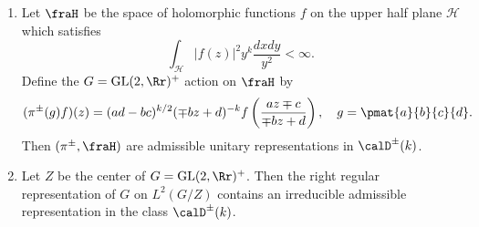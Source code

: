 \begin{theorem}
\begin{enumerate}
\item Let $\fraH$ be the space of holomorphic functions $f$ on the upper half plane $\mathcal{H}$ which satisfies
$$
\int_{\mathcal{H}} |f(z)|^{2} y^{k} \frac{dxdy}{y^{2}}<\infty.
$$
Define the $G = \GL(2, \Rr)^{+}$ action on $\fraH$ by 
$$
(\pi^{\pm}(g)f)(z)= (ad-bc)^{k/2} (\mp bz+d)^{-k} f\left( \frac{az\mp c}{\mp bz + d}\right), \quad g = \pmat{a}{b}{c}{d}.
$$
Then $(\pi^{\pm}, \fraH)$ are admissible unitary representations in $\calD^{\pm}(k)$. 
\item Let $Z$ be the center of $G = \GL(2, \Rr)^{+}$. Then the right regular representation of $G$ on $L^{2}(G/Z)$ contains an irreducible admissible representation in the class $\calD^{\pm}(k)$. 
\end{enumerate}
\end{theorem}
